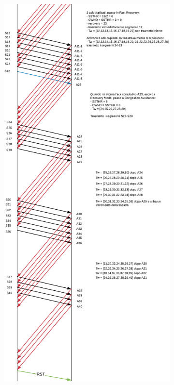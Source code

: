 \documentclass[10pt,a4paper]{article}
\begin{document}
\begin{enumerate}
\begin{figure}[H]
\begin{subfigure}[b]{9cm}
		  \includegraphics[width=\textwidth]{Esame1262019_Conperdite2}
		\end{subfigure}
	  \end{figure}
	\end{enumerate}
\end{document}
